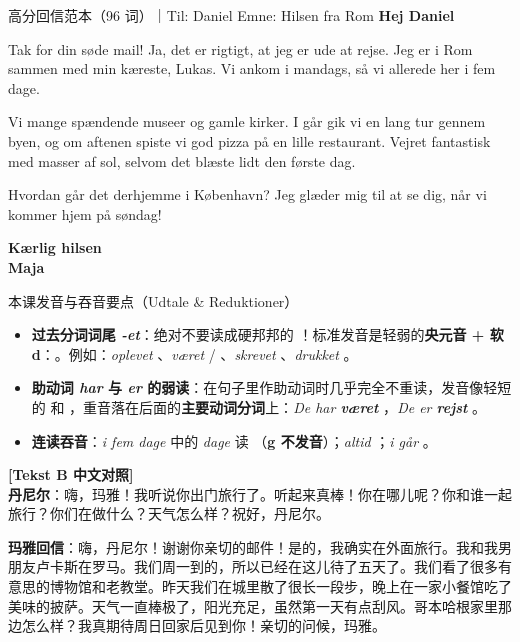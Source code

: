 \begin{emailbox}{高分回信范本（96 词）｜Til: Daniel \quad Emne: Hilsen fra Rom}
\textbf{Hej Daniel}

Tak for din søde mail! Ja, det er rigtigt, at jeg er ude at rejse. Jeg er i Rom sammen med min kæreste, Lukas. Vi ankom i mandags, så vi  allerede  her i fem dage.

Vi  mange spændende museer og gamle kirker. I går gik vi en lang tur gennem byen, og om aftenen spiste vi god pizza på en lille restaurant. Vejret  fantastisk med masser af sol, selvom det blæste lidt den første dag.

Hvordan går det derhjemme i København? Jeg glæder mig til at se dig, når vi kommer hjem på søndag!

\textbf{Kærlig hilsen}\\
\textbf{Maja}
\end{emailbox}

\begin{tipbox}{本课发音与吞音要点（Udtale \& Reduktioner）}
\begin{itemize}
  \item \textbf{过去分词词尾 \textit{-et}}：绝对不要读成硬邦邦的 ！标准发音是轻弱的\textbf{央元音 + 软 d}：。例如：\textit{oplevet} 、\textit{været}  / 、\textit{skrevet} 、\textit{drukket} 。
  \item \textbf{助动词 \textit{har} 与 \textit{er} 的弱读}：在句子里作助动词时几乎完全不重读，发音像轻短的  和 ，重音落在后面的\textbf{主要动词分词}上：\textit{De har \textbf{været}} ，\textit{De er \textbf{rejst}} 。
  \item \textbf{连读吞音}：\textit{i fem dage} 中的 \textit{dage} 读 （\textbf{g 不发音}）；\textit{altid} ；\textit{i går} 。
\end{itemize}
\end{tipbox}

\begin{tcolorbox}[colback=NCDBgGray, colframe=NCDGray!40, boxrule=0.5pt, arc=2pt, breakable]
\small
\textbf{\color{NCDTeal}[Tekst B 中文对照]}\\
\textbf{丹尼尔}：嗨，玛雅！我听说你出门旅行了。听起来真棒！你在哪儿呢？你和谁一起旅行？你们在做什么？天气怎么样？祝好，丹尼尔。

\textbf{玛雅回信}：嗨，丹尼尔！谢谢你亲切的邮件！是的，我确实在外面旅行。我和我男朋友卢卡斯在罗马。我们周一到的，所以已经在这儿待了五天了。我们看了很多有意思的博物馆和老教堂。昨天我们在城里散了很长一段步，晚上在一家小餐馆吃了美味的披萨。天气一直棒极了，阳光充足，虽然第一天有点刮风。哥本哈根家里那边怎么样？我真期待周日回家后见到你！亲切的问候，玛雅。
\end{tcolorbox}

